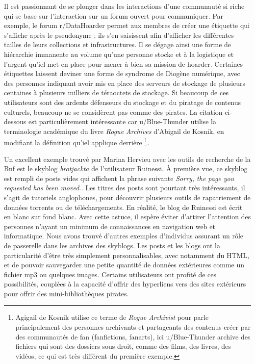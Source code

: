 Il est passionnant de se plonger dans les interactions d'une communauté si riche qui se base sur l'interaction sur un forum ouvert pour communiquer. Par exemple, le forum r/DataHoarder permet aux membres de créer une étiquette qui s'affiche après le pseudonyme ; ils s'en saisissent afin d'afficher les différentes tailles de leurs collections et infrastructures. Il se dégage ainsi une forme de hiérarchie immanente au volume qu'une personne stocke et à la logistique et l'argent qu'iel met en place pour mener à bien sa mission de hoarder. Certaines étiquettes laissent deviner une forme de syndrome de Diogène numérique, avec des personnes indiquant avoir mis en place des serveurs de stockage de plusieurs centaines à plusieurs milliers de téraoctets de stockage. Si beaucoup de ces utilisateurs sont des ardents défenseurs du stockage et du piratage de contenus culturels, beaucoup ne se considèrent pas comme des pirates. La citation ci-dessous est particulièrement intéressante car u/Blue-Thunder utilise la terminologie académique du livre \textit{Rogue Archives} d'Abigail de Kosnik, en modifiant la définition qu'iel applique derrière \footnote{Agigail de Kosnik utilise ce terme de \textit{Rogue Archivist} pour parle principalement des personnes archivants et partageants des contenus créer par des communautés de fan (fanfictions, fanarts), ici u/Blue-Thunder archive des fichiers qui sont des dossiers sous droit, comme des films, des livres, des vidéos, ce qui est très différent du première exemple. }. 

Un excellent exemple trouvé par Marina Hervieu avec les outils de recherche de la Bnf est le skyblog \textit{brotjackta} de l'utilisateur Ruinessi. À première vue, ce skyblog est rempli de posts vides qui affichent la phrase suivante \textit{Sorry, the page you requested has been moved.}. Les titres des posts sont pourtant très intéressants, il s'agit de tutoriels anglophones, pour découvrir plusieurs outils de rapatriement de données torrents ou de téléchargements. En réalité, le blog de Ruinessi est écrit en blanc sur fond blanc. Avec cette astuce, il espère éviter d'attirer l'attention des personnes n'ayant un minimum de connaissances en navigation web et informatique. Nous avons trouvé d'autres exemples d'individus assurant un rôle de passerelle dans les archives des skyblogs. Les posts et les blogs ont la particularité d'être très simplement personnalisables, avec notamment du HTML, et de pouvoir sauvegarder une petite quantité de données extérieures comme un fichier mp3 ou quelques images. Certains utilisateurs ont profité de ces possibilités, couplées à la capacité d'offrir des hyperliens vers des sites extérieurs pour offrir des mini-bibliothèques pirates.

